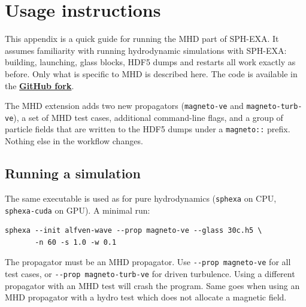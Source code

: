 %
%
%

\section{Usage instructions}
\label{sec:appendixA}

This appendix is a quick guide for running the MHD part of SPH-EXA. It assumes familiarity with running hydrodynamic simulations with SPH-EXA: building, launching, glass blocks, HDF5 dumps and restarts all work exactly as before. Only what is specific to MHD is described here. The code is available in the \href{https://github.com/MuellerNico/sphexa/}{\textbf{GitHub fork}}.

The MHD extension adds two new propagators (\texttt{magneto-ve} and \texttt{magneto-turb-ve}), a set of MHD test cases, additional command-line flags, and a group of particle fields that are written to the HDF5 dumps under a \texttt{magneto::} prefix. Nothing else in the workflow changes.

\subsection{Running a simulation}

The same executable is used as for pure hydrodynamics (\texttt{sphexa} on CPU, \texttt{sphexa-cuda} on GPU). A minimal run:

\begin{verbatim}
sphexa --init alfven-wave --prop magneto-ve --glass 30c.h5 \
       -n 60 -s 1.0 -w 0.1
\end{verbatim}

The propagator must be an MHD propagator. Use \texttt{-{}-prop magneto-ve} for all test cases, or \texttt{-{}-prop magneto-turb-ve} for driven turbulence. Using a different propagator with an MHD test will crash the program. Same goes when using an MHD propagator with a hydro test which does not allocate a magnetic field. 

